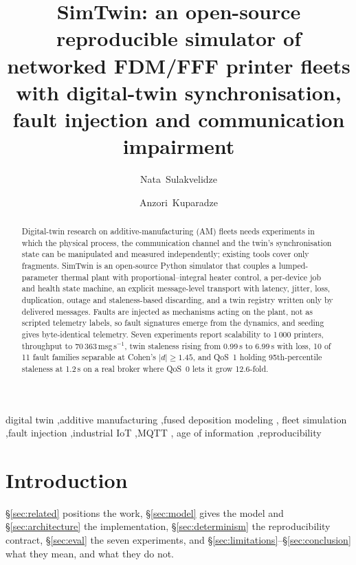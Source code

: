 \documentclass[preprint,12pt,authoryear,nopreprintline]{elsarticle}
\newcommand{\smt}{SimTwin}
\begin{document}
\begin{frontmatter}

\title{\smt{}: an open-source reproducible simulator of networked FDM/FFF
printer fleets with digital-twin synchronisation, fault injection and
communication impairment}

\author[a]{Nata~Sulakvelidze}
\author[a]{Anzori~Kuparadze}

\begin{abstract}
Digital-twin research on additive-manufacturing (AM) fleets needs experiments in
which the physical process, the communication channel and the twin's
synchronisation state can be manipulated and measured independently; existing
tools cover only fragments.
SimTwin is an open-source Python simulator that couples a lumped-parameter
thermal plant with proportional--integral heater control, a per-device job and
health state machine, an explicit message-level transport with latency, jitter,
loss, duplication, outage and staleness-based discarding, and a twin registry
written only by delivered messages.
Faults are injected as mechanisms acting on the plant, not as scripted telemetry
labels, so fault signatures emerge from the dynamics, and seeding gives
byte-identical telemetry.
Seven experiments report scalability to 1\,000 printers, throughput to
70\,363\,msg\,s$^{-1}$, twin staleness rising from 0.99\,s to 6.99\,s with loss,
10 of 11 fault families separable at Cohen's $|d|\ge1.45$, and QoS~1 holding
95th-percentile staleness at 1.2\,s on a real broker where QoS~0 lets it grow
12.6-fold.
\end{abstract}

\begin{keyword}
\nopagebreak[4]
digital twin \sep additive manufacturing \sep fused deposition modeling \sep
fleet simulation \sep fault injection \sep industrial IoT \sep MQTT \sep
age of information \sep reproducibility
\end{keyword}

\end{frontmatter}
\section{Introduction}
\label{sec:intro}
\S\ref{sec:related} positions the work, \S\ref{sec:model} gives the model and
\S\ref{sec:architecture} the implementation, \S\ref{sec:determinism} the
reproducibility contract, \S\ref{sec:eval} the seven experiments, and
\S\ref{sec:limitations}--\S\ref{sec:conclusion} what they mean, and what they
do not.
\end{document}
